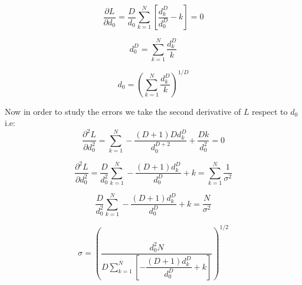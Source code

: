 \documentclass{article}
\theoremstyle{definition}
\theoremstyle{remark}
\begin{document}
\begin{equation}
\dfrac{\partial L}{ \partial d_{0}} = \dfrac{D}{d_{0}}\sum_{k=1}^{N} \left[ \dfrac{d_{k}^{D}}{d_{0}^{D}} - {k} \right] = 0
\end{equation}

\begin{equation}
{d_{0}^{D}} = \sum_{k=1}^{N} \dfrac{d_{k}^{D}}{k} 
\end{equation}

\begin{equation}
d_{0} = \left( \sum_{k=1}^{N} \dfrac{d_{k}^{D}}{k} \right)^{1/D} 
\end{equation}

Now in order to study the errors we take the second derivative of $L$ respect to $d_{0}$ i.e:\\

\begin{equation}
\dfrac{\partial^{2} L}{\partial d_{0}^{2}} = \sum_{k=1}^{N}-\dfrac{(D + 1)Dd_{k}^{D}}{d_{0}^{D+2}} + \dfrac{Dk}{d_{0}^{2}} = 0
\end{equation}

\begin{equation}
\dfrac{\partial^{2} L}{\partial d_{0}^{2}} = \dfrac{D}{d_0^{2}}\sum_{k=1}^{N}-\dfrac{(D + 1)d_{k}^{D}}{d_{0}^{D}} + k = \sum_{k=1}^{N} \dfrac{1}{\sigma^{2}}
\end{equation}

\begin{equation}
\dfrac{D}{d_0^{2}}\sum_{k=1}^{N}-\dfrac{(D + 1)d_{k}^{D}}{d_{0}^{D}} + k = \dfrac{N}{\sigma^{2}}
\end{equation}


\begin{equation}
\sigma = \left( \dfrac{d_{0}^{2}N}{D\sum_{k=1}^{N}\left[-\dfrac{(D + 1)d_{k}^{D}}{d_{0}^{D}} + k \right]}	\right)^{1/2}
\end{equation}




\end{document}
